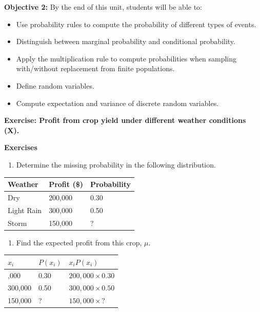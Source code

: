 \documentclass[
]{book}
\providecommand{\tightlist}{%
  \setlength{\itemsep}{0pt}\setlength{\parskip}{0pt}}
\begin{document}
\textbf{Objective 2:} By the end of this unit, students will be able to:

\begin{itemize}
\tightlist
\item
  Use probability rules to compute the probability of different types of events.
\item
  Distinguish between marginal probability and conditional probability.
\item
  Apply the multiplication rule to compute probabilities when sampling with/without replacement from finite populations.
\item
  Define random variables.
\item
  Compute expectation and variance of discrete random variables.
\end{itemize}

\textbf{Exercise: Profit from crop yield under different weather conditions (X).}

\textbf{Exercises}

\begin{enumerate}
\def\labelenumi{\arabic{enumi}.}
\tightlist
\item
  Determine the missing probability in the following distribution.
\end{enumerate}

\begin{longtable}[]{@{}lll@{}}
\toprule\noalign{}
Weather & Profit (\$) & Probability \\
\midrule\noalign{}
\endhead
\bottomrule\noalign{}
\endlastfoot
Dry & 200,000 & 0.30 \\
Light Rain & 300,000 & 0.50 \\
Storm & 150,000 & ? \\
\end{longtable}

\begin{enumerate}
\def\labelenumi{\arabic{enumi}.}
\setcounter{enumi}{1}
\tightlist
\item
  Find the expected profit from this crop, \(\mu\).
\end{enumerate}

\begin{longtable}[]{@{}lll@{}}
\toprule\noalign{}
\(x_i\) & \(P(x_i)\) & \(x_i P(x_i)\) \\
\midrule\noalign{}
\endhead
\bottomrule\noalign{}
\endlastfoot
200,000 & 0.30 & \(200,000 \times 0.30\) \\
300,000 & 0.50 & \(300,000 \times 0.50\) \\
150,000 & ? & \(150,000 \times ?\) \\
\end{longtable}
\end{document}
